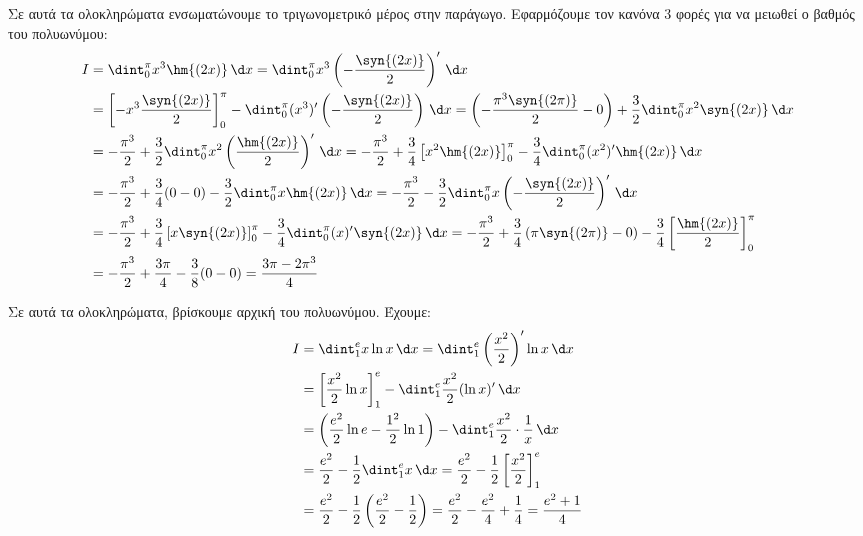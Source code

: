 \lysh
Σε αυτά τα ολοκληρώματα ενσωματώνουμε το τριγωνομετρικό μέρος στην παράγωγο. Εφαρμόζουμε τον κανόνα 3 φορές για να μειωθεί ο βαθμός του πολυωνύμου:
\begin{align*}
I &= \dint_{0}^{\pi}{x^3\hm{(2x)}\, \d x} = \dint_{0}^{\pi}{x^3\left(-\frac{\syn{(2x)}}{2}\right)'\, \d x} \\
&= \left[-x^3\frac{\syn{(2x)}}{2}\right]_0^{\pi} - \dint_{0}^{\pi}{(x^3)'\left(-\frac{\syn{(2x)}}{2}\right)\, \d x} = \left(-\frac{\pi^3 \syn{(2\pi)}}{2} - 0\right) + \frac{3}{2}\dint_{0}^{\pi}{x^2\syn{(2x)}\, \d x} \\
&= -\frac{\pi^3}{2} + \frac{3}{2}\dint_{0}^{\pi}{x^2\left(\frac{\hm{(2x)}}{2}\right)'\, \d x} = -\frac{\pi^3}{2} + \frac{3}{4}\left[x^2\hm{(2x)}\right]_0^{\pi} - \frac{3}{4}\dint_{0}^{\pi}{(x^2)'\hm{(2x)}\, \d x} \\
&= -\frac{\pi^3}{2} + \frac{3}{4}(0 - 0) - \frac{3}{2}\dint_{0}^{\pi}{x\hm{(2x)}\, \d x} = -\frac{\pi^3}{2} - \frac{3}{2}\dint_{0}^{\pi}{x\left(-\frac{\syn{(2x)}}{2}\right)'\, \d x} \\
&= -\frac{\pi^3}{2} + \frac{3}{4}\left[x\syn{(2x)}\right]_0^{\pi} - \frac{3}{4}\dint_{0}^{\pi}{(x)'\syn{(2x)}\, \d x} = -\frac{\pi^3}{2} + \frac{3}{4}\left(\pi\syn{(2\pi)} - 0\right) - \frac{3}{4}\left[\frac{\hm{(2x)}}{2}\right]_0^{\pi} \\
&= -\frac{\pi^3}{2} + \frac{3\pi}{4} - \frac{3}{8}(0 - 0) = \frac{3\pi - 2\pi^3}{4}
\end{align*}

\lysh
Σε αυτά τα ολοκληρώματα, βρίσκουμε αρχική του πολυωνύμου. Έχουμε:
\begin{align*}
I &= \dint_1^e x \ln{x} \, \d x = \dint_1^e \left(\frac{x^2}{2}\right)' \ln{x} \, \d x \\
&= \left[\frac{x^2}{2} \ln{x}\right]_1^e - \dint_1^e \frac{x^2}{2} (\ln{x})' \, \d x \\
&= \left( \frac{e^2}{2}\ln{e} - \frac{1^2}{2}\ln{1} \right) - \dint_1^e \frac{x^2}{2} \cdot \frac{1}{x} \, \d x \\
&= \frac{e^2}{2} - \frac{1}{2}\dint_1^e x \, \d x = \frac{e^2}{2} - \frac{1}{2} \left[\frac{x^2}{2}\right]_1^e \\
&= \frac{e^2}{2} - \frac{1}{2} \left( \frac{e^2}{2} - \frac{1}{2} \right) = \frac{e^2}{2} - \frac{e^2}{4} + \frac{1}{4} = \frac{e^2 + 1}{4}
\end{align*}

